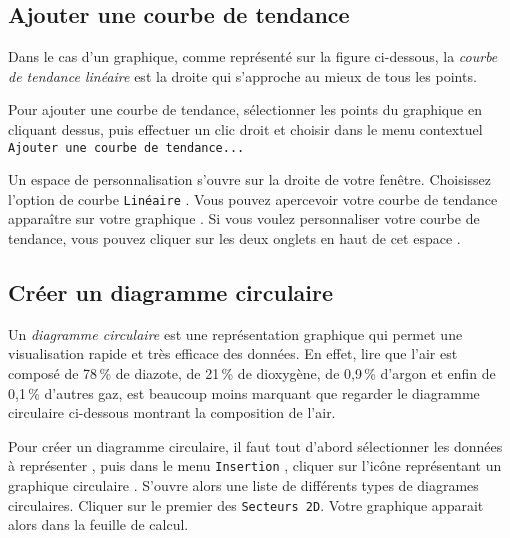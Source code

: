 \subsection{Ajouter une courbe de tendance}\label{Calc2CourbeTendance} 

Dans le cas d'un graphique, comme représenté sur la figure ci-dessous, la \emph{courbe de tendance linéaire} est la droite qui s'approche au mieux de tous les points. 



Pour ajouter une courbe de tendance, sélectionner les points du graphique en cliquant dessus, puis effectuer un clic droit et choisir dans le menu contextuel \texttt{Ajouter une courbe de tendance...}

%

Un espace de personnalisation s'ouvre sur la droite de votre fenêtre. Choisissez l'option de courbe \texttt{Linéaire} . Vous pouvez apercevoir votre courbe de tendance apparaître sur votre graphique . Si vous voulez personnaliser votre courbe de tendance, vous pouvez cliquer sur les deux onglets en haut de cet espace .



\subsection{Créer un diagramme circulaire}\label{Calc2DiagCirculaire}

Un \emph{diagramme circulaire} est une représentation graphique qui permet une visualisation rapide et très efficace des données. En effet, lire que l'air est composé de 78\,\% de diazote, de 21\,\% de dioxygène, de 0,9\,\% d'argon et enfin de 0,1\,\% d'autres gaz, est beaucoup moins marquant que regarder le diagramme circulaire ci-dessous montrant la composition de l'air.


Pour créer un diagramme circulaire, il faut tout d'abord sélectionner les données à représenter , puis dans le menu \texttt{Insertion} , cliquer sur l'icône représentant un graphique circulaire . S'ouvre alors une liste de différents types de diagrames circulaires. Cliquer sur le premier des \texttt{Secteurs 2D}. Votre graphique apparait alors dans la feuille de calcul.

